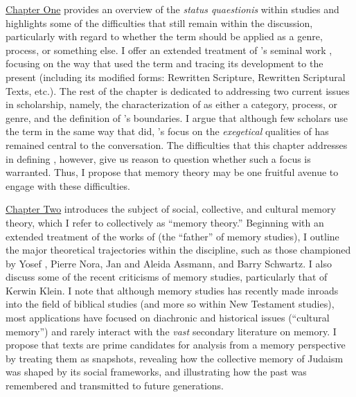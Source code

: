 \hyperref[chap:rwb]{Chapter One} provides an overview of the \emph{status quaestionis} within \rwb studies and highlights some of the difficulties that still remain within the discussion, particularly with regard to whether the term should be applied as a genre, process, or something else. I offer an extended treatment of \vermes's seminal work , focusing on the way that \vermes used the term and tracing its development to the present (including its modified forms: Rewritten Scripture, Rewritten Scriptural Texts, etc.). The rest of the chapter is dedicated to addressing two current issues in \rwb scholarship, namely, the characterization of \rwb as either a category, process, or genre, and the definition of \rwb's boundaries. I argue that although few scholars use the term \rwb in the same way that \vermes did, \vermes's focus on the \emph{exegetical} qualities of \rwb has remained central to the conversation. The difficulties that this chapter addresses in defining \rwb, however, give us reason to question whether such a focus is warranted. Thus, I propose that memory theory may be one fruitful avenue to engage with these difficulties.

\hyperref[chap:memory]{Chapter Two} introduces the subject of social, collective, and cultural memory theory, which I refer to collectively as ``memory theory.'' Beginning with an extended treatment of the works of \Halbwachs (the ``father'' of memory studies), I outline the major theoretical trajectories within the discipline, such as those championed by Yosef \yerushalmi, Pierre Nora, Jan and Aleida Assmann, and Barry Schwartz. I also discuss some of the recent criticisms of memory studies, particularly that of Kerwin Klein. I note that although memory studies has recently made inroads into the field of biblical studies (and more so within New Testament studies), most applications have focused on diachronic and historical issues (``cultural memory'') and rarely interact with the \emph{vast} secondary literature on memory. I propose that \rwb texts are prime candidates for analysis from a memory perspective by treating them as snapshots, revealing how the collective memory of \secondtemple Judaism was shaped by its social frameworks, and illustrating how the past was remembered and transmitted to future generations.

